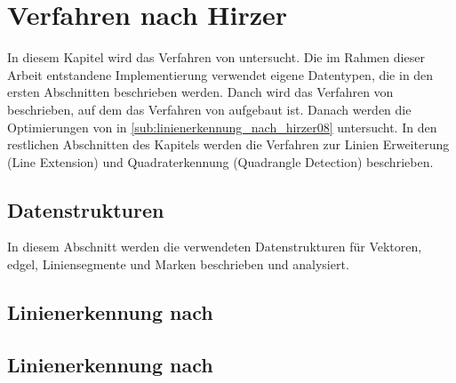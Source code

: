 \section{Verfahren nach Hirzer} %
\label{sec:hirzer}

In diesem Kapitel wird das Verfahren von \citeauthor{hirzer08} untersucht. Die im Rahmen dieser Arbeit entstandene
 Implementierung verwendet eigene Datentypen, die in den ersten Abschnitten beschrieben werden. Danch wird das
 Verfahren von \citeauthor{clarke96} beschrieben, auf dem das Verfahren von \citeauthor{hirzer08} aufgebaut ist. Danach
 werden die Optimierungen von \citeauthor{hirzer08} in \autoref{sub:linienerkennung_nach_hirzer08} untersucht. In den
 restlichen Abschnitten des Kapitels werden die Verfahren zur Linien Erweiterung (Line Extension) und Quadraterkennung
 (Quadrangle Detection) beschrieben.

\subsection{Datenstrukturen} %
\label{sub:datenstrukturen}

In diesem Abschnitt werden die verwendeten Datenstrukturen für Vektoren, \gls{edgel}, Liniensegmente und Marken
 beschrieben und analysiert.












\subsection{Linienerkennung nach \texorpdfstring{\citeauthor{clarke96}}{Clarke, Carlsson und Zisserman}} %
\label{sub:linienerkennung_nach_clarke96}


\subsection{Linienerkennung nach \texorpdfstring{\citeauthor{hirzer08}}{Hirzer}} %
\label{sub:linienerkennung_nach_hirzer08}


